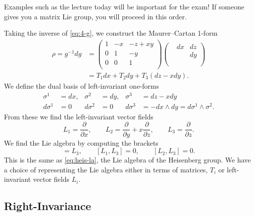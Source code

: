 
\begin{remark}
  Examples such as the lecture today will be important for the exam!
  If someone gives you a matrix Lie group, you will proceed in this order.
\end{remark}
Taking the inverse of \eqref{eq:4-g}, we construct the Maurer--Cartan 1-form
\begin{align}
  \rho = g^{-1} dg &=
  \begin{pmatrix}
    1 & -x & -z+xy \\
   0 & 1 & -y \\
   0 & 0 & 1 \\
  \end{pmatrix}
  \begin{pmatrix}
    & dx & dz \\
    &  & dy \\
    &  &  \\
  \end{pmatrix} \\
		   &= T_1 dx + T_2 dy + T_3 (dz - x dy).
\end{align}
We define the dual basis of left-invariant one-forms
\begin{align}
  \sigma^1 &= dx, & \sigma^2 &= dy, & \sigma^3 &= dz - x dy \\
  d\sigma^1 &= 0 & d\sigma^2 &= 0 & d \sigma^3 &= -dx \wedge dy = d\sigma^1 \wedge \sigma^2.
\end{align}
From these we find the left-invariant vector fields
\begin{equation}
  L_1 = \frac{\partial }{\partial x}, \qquad L_2 = \frac{\partial }{\partial y} + x \frac{\partial }{\partial z}, \qquad L_3 = \frac{\partial }{\partial z}.
\end{equation}
We find the Lie algebra by computing the brackets
\begin{equation}
  [L_1, L_2] = L_3, \qquad [L_1, L_3] = 0, \qquad [L_2, L_3] = 0.
\end{equation}
This is the same as \eqref{eq:heis-la}, the Lie algebra of the Heisenberg group.
We have a choice of representing the Lie algebra either in terms of matrices, $T_i$ or left-invariant vector fields $L_i$.

\subsection{Right-Invariance}%
\label{sub:right_invariance}

